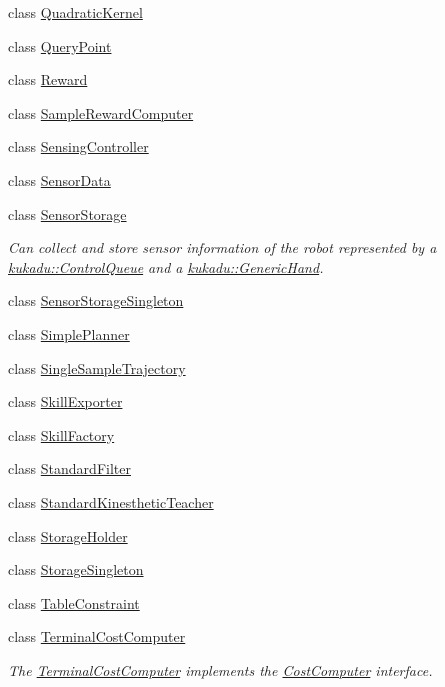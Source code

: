 \begin{DoxyCompactItemize}
\item 
class \hyperlink{classkukadu_1_1QuadraticKernel}{Quadratic\+Kernel}
\item 
class \hyperlink{classkukadu_1_1QueryPoint}{Query\+Point}
\item 
class \hyperlink{classkukadu_1_1Reward}{Reward}
\item 
class \hyperlink{classkukadu_1_1SampleRewardComputer}{Sample\+Reward\+Computer}
\item 
class \hyperlink{classkukadu_1_1SensingController}{Sensing\+Controller}
\item 
class \hyperlink{classkukadu_1_1SensorData}{Sensor\+Data}
\item 
class \hyperlink{classkukadu_1_1SensorStorage}{Sensor\+Storage}
\begin{DoxyCompactList}\small\item\em Can collect and store sensor information of the robot represented by a \hyperlink{classkukadu_1_1ControlQueue}{kukadu\+::\+Control\+Queue} and a \hyperlink{classkukadu_1_1GenericHand}{kukadu\+::\+Generic\+Hand}. \end{DoxyCompactList}\item 
class \hyperlink{classkukadu_1_1SensorStorageSingleton}{Sensor\+Storage\+Singleton}
\item 
class \hyperlink{classkukadu_1_1SimplePlanner}{Simple\+Planner}
\item 
class \hyperlink{classkukadu_1_1SingleSampleTrajectory}{Single\+Sample\+Trajectory}
\item 
class \hyperlink{classkukadu_1_1SkillExporter}{Skill\+Exporter}
\item 
class \hyperlink{classkukadu_1_1SkillFactory}{Skill\+Factory}
\item 
class \hyperlink{classkukadu_1_1StandardFilter}{Standard\+Filter}
\item 
class \hyperlink{classkukadu_1_1StandardKinestheticTeacher}{Standard\+Kinesthetic\+Teacher}
\item 
class \hyperlink{classkukadu_1_1StorageHolder}{Storage\+Holder}
\item 
class \hyperlink{classkukadu_1_1StorageSingleton}{Storage\+Singleton}
\item 
class \hyperlink{classkukadu_1_1TableConstraint}{Table\+Constraint}
\item 
class \hyperlink{classkukadu_1_1TerminalCostComputer}{Terminal\+Cost\+Computer}
\begin{DoxyCompactList}\small\item\em The \hyperlink{classkukadu_1_1TerminalCostComputer}{Terminal\+Cost\+Computer} implements the \hyperlink{classkukadu_1_1CostComputer}{Cost\+Computer} interface. \end{DoxyCompactList}\item 

\end{DoxyCompactItemize}
